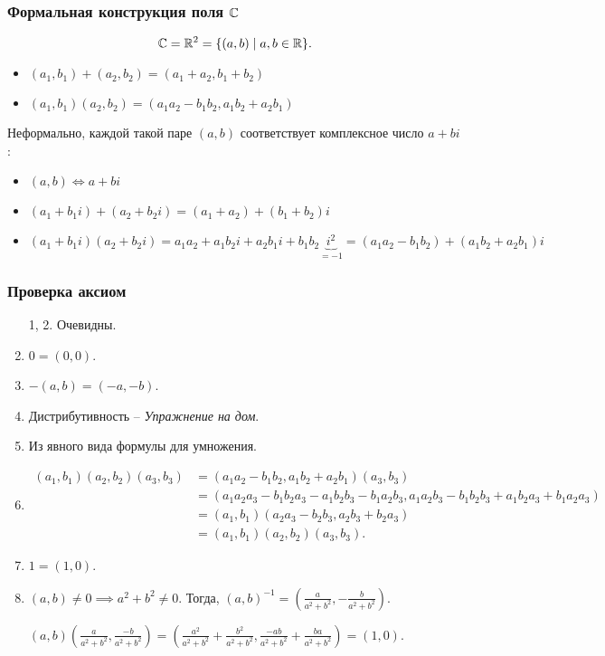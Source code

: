 \subsubsection{Формальная конструкция поля $\mathbb{C}$}

\begin{equation*}
    \mathbb{C} = \mathbb{R}^2 = \{(a, b) \mid a, b \in \mathbb{R}\}
.\end{equation*}

\begin{itemize}
\item $(a_1, b_1) + (a_2, b_2) = (a_1 + a_2, b_1 + b_2)$
\item $(a_1, b_1) (a_2, b_2) = (a_1 a_2 - b_1 b_2, a_1 b_2 + a_2 b_1)$
\end{itemize}

Неформально, каждой такой паре $(a, b)$ соответствует комплексное число $a + bi$:
\begin{itemize}
\item $(a, b) \iff a + bi$
\item $(a_1 + b_1 i) + (a_2 + b_2 i) = (a_1 + a_2) + (b_1 + b_2)i$
\item $(a_1 + b_1 i) (a_2 + b_2 i) = a_1 a_2 + a_1 b_2 i + a_2 b_1 i + b_1 b_2 \underbrace{i^2}_{= -1} = (a_1 a_2 - b_1 b_2) + (a_1 b_2 + a_2 b_1) i$
\end{itemize}

\subsubsection{Проверка аксиом}

\begin{enumerate}
\item[1, 2.] Очевидны.
\setcounter{enumi}{2}
\item $0 = (0, 0)$.
\item $-(a, b) = (-a, -b)$.
\item Дистрибутивность -- \textit{Упражнение на дом}.
\item Из явного вида формулы для умножения.
\item
    \begin{align*}
        (a_1, b_1)(a_2, b_2)(a_3, b_3)
        &= (a_1 a_2 - b_1 b_2, a_1 b_2 + a_2 b_1) (a_3, b_3) \\
        &= (a_1 a_2 a_3 - b_1 b_2 a_3 - a_1 b_2 b_3 - b_1 a_2 b_3, a_1 a_2 b_3 - b_1 b_2 b_3 + a_1 b_2 a_3 + b_1 a_2 a_3) \\
        &= (a_1, b_1)(a_2 a_3 - b_2 b_3, a_2 b_3 + b_2 a_3) \\
        &= (a_1, b_1)(a_2, b_2)(a_3, b_3)
    .\end{align*}

\item $1 = (1, 0)$.

\item $(a, b) \neq 0 \implies a^2 + b^2 \neq 0$. Тогда, $(a, b)^{-1} = \left(\frac{a}{a^2 + b^2}, -\frac{b}{a^2 + b^2}\right)$.

    $(a, b) (\frac{a}{a^2 + b^2}, \frac{-b}{a^2 + b^2}) = (\frac{a^2}{a^2 + b^2} + \frac{b^2}{a^2 + b^2}, \frac{-ab}{a^2 + b^2} + \frac{ba}{a^2 + b^2}) = (1, 0)$.
\end{enumerate}

